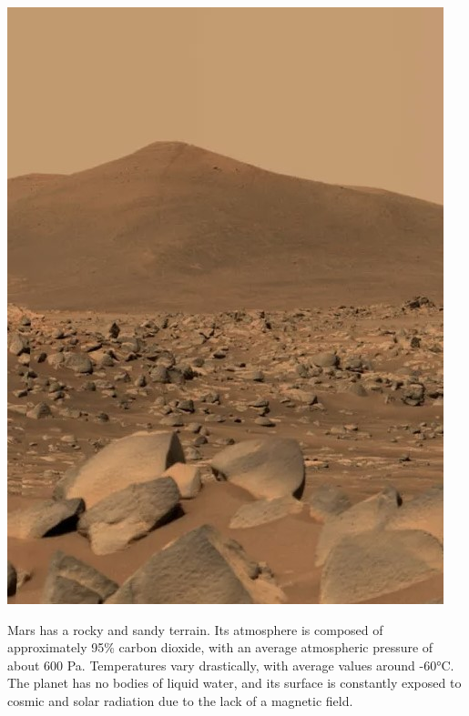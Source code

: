 \documentclass[./main_en.tex]{subfiles}
\begin{document}
\nolinenumbers

\newpage
\renewcommand{\headrulewidth}{0pt}
\thispagestyle{fancy}
\fancyhf{} %
\fancyfoot{} %
\fancyfoot[C]{\thepage}

\par \hfill
\vspace{40mm}
\begin{adjustwidth}{45pt}{45pt}
\begin{center}
    \includegraphics[scale=0.7]{figs/mars.jpg}\\
\end{center}
\vspace{10mm}
\noindent \textsf{Mars has a rocky and sandy terrain. Its atmosphere is composed of approximately 95\% carbon dioxide, with an average atmospheric pressure of about 600 Pa. Temperatures vary drastically, with average values around -60°C. The planet has no bodies of liquid water, and its surface is constantly exposed to cosmic and solar radiation due to the lack of a magnetic field.}
\end{adjustwidth}
\clearpage
\end{document}
